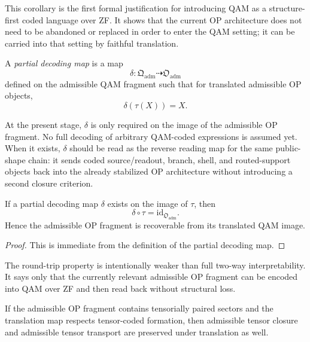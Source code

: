 \begin{remark}
This corollary is the first formal justification for introducing QAM as a structure-first coded language over ZF. It shows that the current OP architecture does not need to be abandoned or replaced in order to enter the QAM setting; it can be carried into that setting by faithful translation.
\end{remark}

\begin{definition}
A \emph{partial decoding map} is a map
\[
\delta:\mathfrak{Q}_{\mathrm{adm}}\dashrightarrow \mathfrak{O}_{\mathrm{adm}}
\]
defined on the admissible QAM fragment such that for translated admissible OP objects,
\[
\delta(\tau(X))=X.
\]
\end{definition}

\begin{remark}
At the present stage, $\delta$ is only required on the image of the admissible OP fragment. No full decoding of arbitrary QAM-coded expressions is assumed yet. When it exists, $\delta$ should be read as the reverse reading map for the same public-shape chain: it sends coded source/readout, branch, shell, and routed-support objects back into the already stabilized OP architecture without introducing a second closure criterion.
\end{remark}

\begin{proposition}
If a partial decoding map $\delta$ exists on the image of $\tau$, then
\[
\delta\circ\tau = \mathrm{id}_{\mathfrak{O}_{\mathrm{adm}}}.
\]
Hence the admissible OP fragment is recoverable from its translated QAM image.
\end{proposition}

\begin{proof}
This is immediate from the definition of the partial decoding map.
\end{proof}

\begin{remark}
The round-trip property is intentionally weaker than full two-way interpretability. It says only that the currently relevant admissible OP fragment can be encoded into QAM over ZF and then read back without structural loss.
\end{remark}

\begin{corollary}
If the admissible OP fragment contains tensorially paired sectors and the translation map respects tensor-coded formation, then admissible tensor closure and admissible tensor transport are preserved under translation as well.
\end{corollary}

